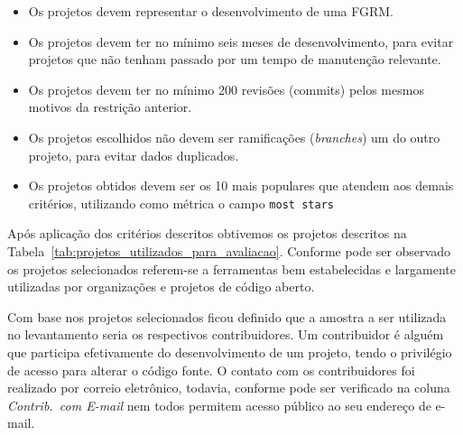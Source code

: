 \begin{itemize}
	\item Os projetos devem representar o desenvolvimento de uma FGRM\@.
	\item Os projetos devem ter no mínimo seis meses de desenvolvimento, para
		evitar projetos que não tenham passado por um tempo de manutenção
		relevante.
	\item Os projetos devem  ter  no  mínimo  200  revisões (commits)  pelos
		mesmos motivos  da restrição anterior.
	\item Os projetos escolhidos não devem ser ramificações (\textsl{branches}) um
		do outro projeto, para evitar dados duplicados.
	\item Os projetos obtidos devem ser os 10 mais populares que atendem aos
		demais critérios, utilizando como métrica o campo \texttt{most stars}
\end{itemize}

Após aplicação dos critérios descritos obtivemos os projetos descritos na
Tabela~\ref{tab:projetos_utilizados_para_avaliacao}. Conforme pode ser observado
os projetos selecionados referem-se a ferramentas bem estabelecidas e largamente
utilizadas por organizações e projetos de código aberto.

\begin{table}[htpb]
\centering
{}
\caption{Projetos utilizados no levantamento com profissionais. Os dados
	apresentados tem como referência 07/03/2017.}
\label{tab:projetos_utilizados_para_avaliacao}
\end{table}


Com base nos projetos selecionados ficou definido que a amostra a ser utilizada
no levantamento seria os respectivos contribuidores. Um contribuidor é alguém
que participa efetivamente do desenvolvimento de um projeto, tendo o privilégio
de acesso para alterar o código fonte. O contato com os contribuidores foi
realizado por correio eletrônico, todavia, conforme pode ser verificado na
coluna \textit{Contrib.\ com E-mail} nem todos permitem acesso público ao seu
endereço de e-mail.

